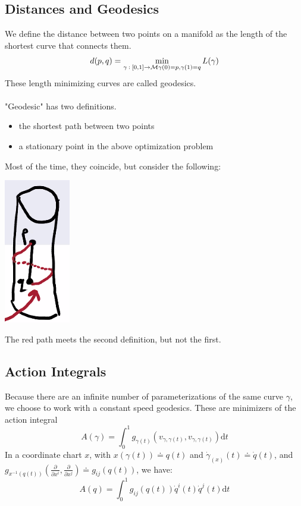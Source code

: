 \documentclass[10pt]{article}
\newcommand{\dd}{\text{d}}
\begin{document}
\subsection*{Distances and Geodesics}
We define the distance between two points on a manifold as the length of the shortest curve that connects them.
\[d(p, q) = \min_{\gamma\::\: [0, 1] \rightarrow \mathcal{M}\\ \gamma(0) = p, \gamma(1) = q} L(\gamma)\]
These length minimizing curves are called geodesics.\\\\
"Geodesic" has two definitions.
\begin{itemize}
	\item the shortest path between two points
	\item a stationary point in the above optimization problem
\end{itemize}
Most of the time, they coincide, but consider the following:
\begin{center} 
	\includegraphics*[scale=0.8]{W8_2.png} 
\end{center}
The red path meets the second definition, but not the first.

\subsection*{Action Integrals}
Because there are an infinite number of parameterizations of the same curve $\gamma$, we choose to work with a constant speed geodesics.  These are minimizers of the action integral
\[A(\gamma) = \int_0^1 g_{\gamma(t)} (v_{\gamma, \gamma(t)}, v_{\gamma, \gamma(t)}) \dd t\]
In a coordinate chart $x$, with $x(\gamma(t)) \doteq q(t)$ and $\dot{\gamma}_{(x)}(t) \doteq \dot{q}(t)$, and $g_{x^{-1} (q(t))} \left(\frac{\partial}{\partial x^i}, \frac{\partial}{\partial x^j}\right) \doteq g_{ij}(q(t))$, we have:
\[A(q) = \int_0^1 g_{ij} (q(t)) \dot{q}^i(t) \dot{q}^j(t) \dd t\]
\end{document}
